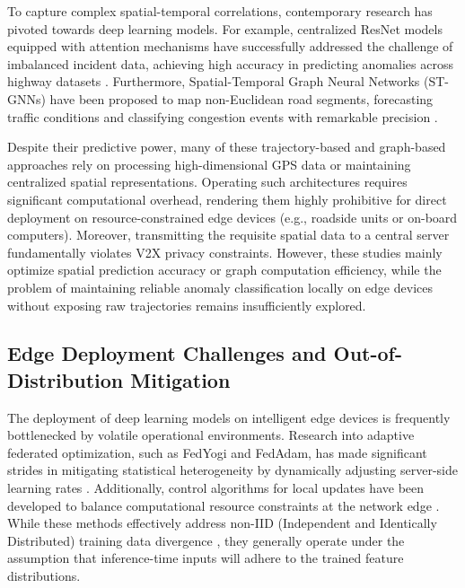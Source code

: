 To capture complex spatial-temporal correlations, contemporary research has pivoted towards deep learning models. For example, centralized ResNet models equipped with attention mechanisms have successfully addressed the challenge of imbalanced incident data, achieving high accuracy in predicting anomalies across highway datasets \cite{zhang2022deep}. Furthermore, Spatial-Temporal Graph Neural Networks (ST-GNNs) have been proposed to map non-Euclidean road segments, forecasting traffic conditions and classifying congestion events with remarkable precision \cite{jiang2023gnn}. 

Despite their predictive power, many of these trajectory-based and graph-based approaches rely on processing high-dimensional GPS data or maintaining centralized spatial representations. Operating such architectures requires significant computational overhead, rendering them highly prohibitive for direct deployment on resource-constrained edge devices (e.g., roadside units or on-board computers). Moreover, transmitting the requisite spatial data to a central server fundamentally violates V2X privacy constraints. However, these studies mainly optimize spatial prediction accuracy or graph computation efficiency, while the problem of maintaining reliable anomaly classification locally on edge devices without exposing raw trajectories remains insufficiently explored.

\subsection{Edge Deployment Challenges and Out-of-Distribution Mitigation}

The deployment of deep learning models on intelligent edge devices is frequently bottlenecked by volatile operational environments. Research into adaptive federated optimization, such as FedYogi and FedAdam, has made significant strides in mitigating statistical heterogeneity by dynamically adjusting server-side learning rates \cite{reddi2021adaptive}. Additionally, control algorithms for local updates have been developed to balance computational resource constraints at the network edge \cite{wang2019adaptive}. While these methods effectively address non-IID (Independent and Identically Distributed) training data divergence \cite{zhao2018federated}, they generally operate under the assumption that inference-time inputs will adhere to the trained feature distributions. 

